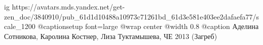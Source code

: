  
 
 
 
 

\ifcmt
  ig https://avatars.mds.yandex.net/get-zen_doc/3840910/pub_61d1d10488a10973c71261bd_61d3e581e403ee2dafaefa77/scale_1200
	@captionsetup font=large
	@wrap center
	@width 0.8
	@caption Аделина Сотникова, Каролина Костнер, Лиза Туктамышева, ЧЕ 2013 (Загреб)
\fi
